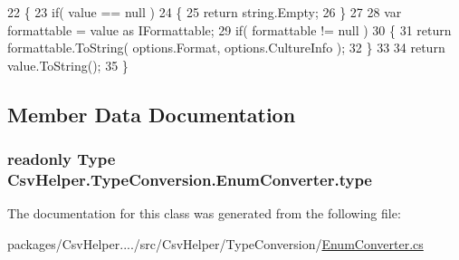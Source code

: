 \begin{DoxyCode}
22         \{
23             \textcolor{keywordflow}{if}( value == null )
24             \{
25                 \textcolor{keywordflow}{return} string.Empty;
26             \}
27 
28             var formattable = value as IFormattable;
29             \textcolor{keywordflow}{if}( formattable != null )
30             \{
31                 \textcolor{keywordflow}{return} formattable.ToString( options.Format, options.CultureInfo );
32             \}
33 
34             \textcolor{keywordflow}{return} value.ToString();
35         \}
\end{DoxyCode}


\subsection{Member Data Documentation}
\hypertarget{a00075_a3c144b5c7e2720e66dc957aaed671e9a}{
\subsubsection[{type}]{\setlength{\rightskip}{0pt plus 5cm}readonly Type Csv\-Helper.\-Type\-Conversion.\-Enum\-Converter.\-type\hspace{0.3cm}{\ttfamily [private]}}}\label{a00075_a3c144b5c7e2720e66dc957aaed671e9a}


The documentation for this class was generated from the following file\-:\begin{DoxyCompactItemize}
\item 
packages/\-Csv\-Helper..../src/\-Csv\-Helper/\-Type\-Conversion/\hyperlink{a00229}{Enum\-Converter.\-cs}\end{DoxyCompactItemize}
